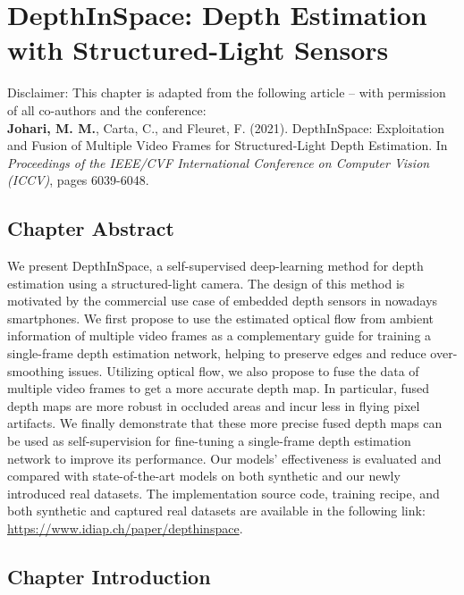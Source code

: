 \chapter{DepthInSpace: Depth Estimation with Structured-Light Sensors} \label{sec:chapter2}

\begin{tcolorbox}[colback=gray!20, boxrule=1pt, colframe=black]
  Disclaimer: This chapter is adapted from the following article – with permission of all co-authors and the conference: \\

    \textbf{Johari, M. M.}, Carta, C., and Fleuret, F. (2021). DepthInSpace: Exploitation and Fusion of Multiple Video Frames for Structured-Light Depth Estimation. In \textit{Proceedings of the IEEE/CVF International Conference on Computer Vision (ICCV)}, pages 6039-6048.
\end{tcolorbox}

\section{Chapter Abstract}

We present DepthInSpace, a self-supervised deep-learning method for depth estimation using a structured-light camera. The design of this method is motivated by the commercial use case of embedded depth sensors in nowadays smartphones. We first propose to use the estimated optical flow from ambient information of multiple video frames as a complementary guide for training a single-frame depth estimation network, helping to preserve edges and reduce over-smoothing issues. Utilizing optical flow, we also propose to fuse the data of multiple video frames to get a more accurate depth map. In particular, fused depth maps are more robust in occluded areas and incur less in flying pixel artifacts. We finally demonstrate that these more precise fused depth maps can be used as self-supervision for fine-tuning a single-frame depth estimation network to improve its performance. Our models' effectiveness is evaluated and compared with state-of-the-art models on both synthetic and our newly introduced real datasets. The implementation source code, training recipe, and both synthetic and captured real datasets are available in the following link: \href{https://www.idiap.ch/paper/depthinspace}{https://www.idiap.ch/paper/depthinspace}.

\section{Chapter Introduction}

